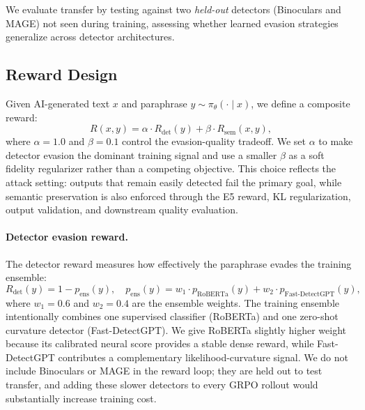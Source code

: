 \documentclass[11pt]{article}
\begin{document}
We evaluate transfer by testing against two \emph{held-out} detectors (Binoculars and MAGE) not seen during training, assessing whether learned evasion strategies generalize across detector architectures.

\subsection{Reward Design}
\label{sec:reward}

Given AI-generated text $x$ and paraphrase $y \sim \pi_\theta(\cdot \mid x)$, we define a composite reward:
\begin{equation}
  R(x, y) = \alpha \cdot R_{\text{det}}(y) + \beta \cdot R_{\text{sem}}(x, y),
  \label{eq:reward}
\end{equation}
where $\alpha = 1.0$ and $\beta = 0.1$ control the evasion-quality tradeoff.
We set $\alpha$ to make detector evasion the dominant training signal and use a smaller $\beta$ as a soft fidelity regularizer rather than a competing objective. This choice reflects the attack setting: outputs that remain easily detected fail the primary goal, while semantic preservation is also enforced through the E5 reward, KL regularization, output validation, and downstream quality evaluation.

\paragraph{Detector evasion reward.} The detector reward measures how effectively the paraphrase evades the training ensemble:
\begin{equation}
  R_{\text{det}}(y) = 1 - p_{\text{ens}}(y), \quad p_{\text{ens}}(y) = w_1 \cdot p_{\text{RoBERTa}}(y) + w_2 \cdot p_{\text{Fast-DetectGPT}}(y),
\end{equation}
where $w_1 = 0.6$ and $w_2 = 0.4$ are the ensemble weights. The training ensemble intentionally combines one supervised classifier (RoBERTa) and one zero-shot curvature detector (Fast-DetectGPT). We give RoBERTa slightly higher weight because its calibrated neural score provides a stable dense reward, while Fast-DetectGPT contributes a complementary likelihood-curvature signal. We do not include Binoculars or MAGE in the reward loop; they are held out to test transfer, and adding these slower detectors to every GRPO rollout would substantially increase training cost.
\end{document}

